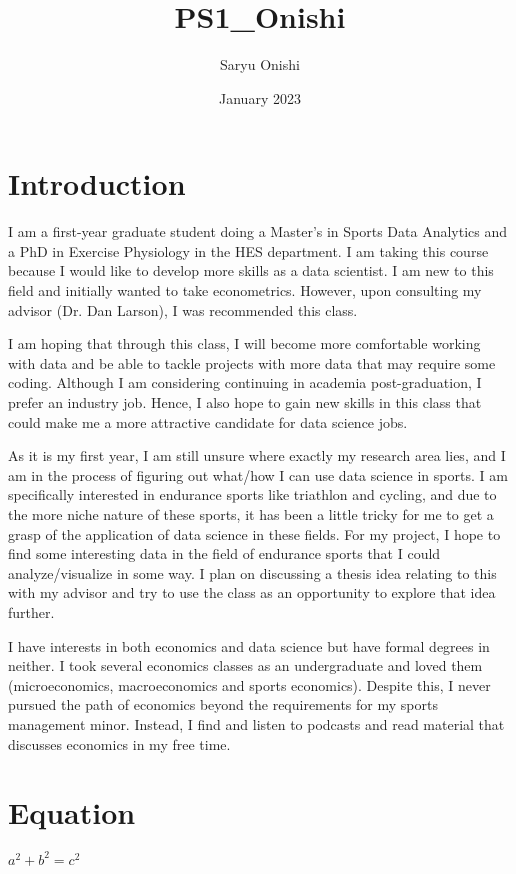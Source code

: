 \documentclass{article}
\title{PS1_Onishi}
\author{Saryu Onishi}
\date{January 2023}
\begin{document}
\maketitle

\section{Introduction}

I am a first-year graduate student doing a Master's in Sports Data Analytics and a PhD in Exercise Physiology in the HES department. I am taking this course because I would like to develop more skills as a data scientist. I am new to this field and initially wanted to take econometrics. However, upon consulting my advisor (Dr. Dan Larson), I was recommended this class. 

I am hoping that through this class, I will become more comfortable working with data and be able to tackle  projects with more data that may require some coding. Although I am considering continuing in academia post-graduation, I prefer an industry job. Hence, I also hope to gain new skills in this class that could make me a more attractive candidate for data science jobs.

As it is my first year, I am still unsure where exactly my research area lies, and I am in the process of figuring out what/how I can use data science in sports. I am specifically interested in endurance sports like triathlon and cycling, and due to the more niche nature of these sports, it has been a little tricky for me to get a grasp of the application of data science in these fields. For my project, I hope to find some interesting data in the field of endurance sports that I could analyze/visualize in some way. I plan on discussing a thesis idea relating to this with my advisor and try to use the class as an opportunity to explore that idea further. 

I have interests in both economics and data science but have formal degrees in neither. I took several economics classes as an undergraduate and loved them (microeconomics, macroeconomics and sports economics). Despite this, I never pursued the path of economics beyond the requirements for my sports management minor. Instead, I find and listen to podcasts and read material that discusses economics in my free time.

\section{Equation}

$a^2+b^2=c^2$
\end{document}
